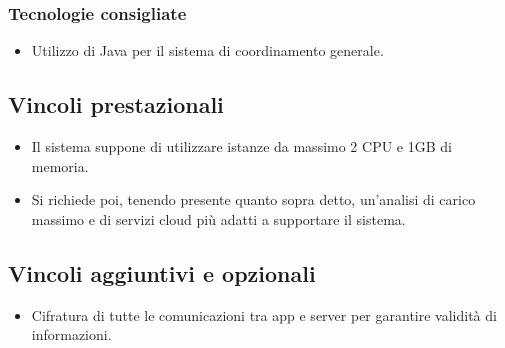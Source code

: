 \subsubsection{Tecnologie consigliate}

\begin{itemize}
    \item Utilizzo di Java per il sistema di coordinamento generale.
\end{itemize}

\subsection{Vincoli prestazionali}

\begin{itemize}
    \item Il sistema suppone di utilizzare istanze da massimo 2 CPU e 1GB di memoria.
    \item Si richiede poi, tenendo presente quanto sopra detto, un'analisi di carico massimo e di servizi cloud più adatti a supportare il sistema.
\end{itemize}

\subsection{Vincoli aggiuntivi e opzionali}
\begin{itemize}
    \item Cifratura di tutte le comunicazioni tra app e server per garantire validità di informazioni.
\end{itemize}
